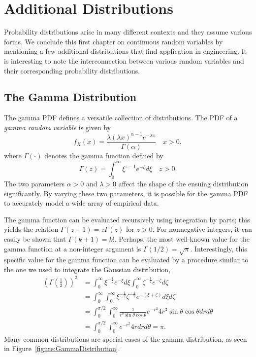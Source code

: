 \section{Additional Distributions}

Probability distributions arise in many different contexts and they assume various forms.
We conclude this first chapter on continuous random variables by mentioning a few additional distributions that find application in engineering.
It is interesting to note the interconnection between various random variables and their corresponding probability distributions.


\subsection{The Gamma Distribution}

The gamma PDF defines a versatile collection of distributions.
The PDF of a \emph{gamma random variable} is given by 
\begin{equation*}
f_X (x) = \frac{\lambda (\lambda x)^{\alpha - 1} e^{-\lambda x}}{\Gamma (\alpha)} \quad  x > 0,
\end{equation*}
where $\Gamma(\cdot)$ denotes the gamma function defined by
\begin{equation*}
\Gamma (z) = \int_0^{\infty} \xi^{z-1} e^{-\xi} d\xi \quad z > 0 .
\end{equation*}
The two parameters $\alpha > 0$ and $\lambda > 0$ affect the shape of the ensuing distribution significantly.
By varying these two parameters, it is possible for the gamma PDF to accurately model a wide array of empirical data.

The gamma function can be evaluated recursively using integration by parts; this yields the relation $\Gamma (z+1) = z \Gamma (z)$ for $z > 0$.
For nonnegative integers, it can easily be shown that $\Gamma (k + 1) = k!$.
Perhaps, the most well-known value for the gamma function at a non-integer argument is $\Gamma ( 1/2 ) = \sqrt{\pi}$.
Interestingly, this specific value for the gamma function can be evaluated by a procedure similar to the one we used to integrate the Gaussian distribution,
\begin{equation*}
\begin{split}
\left( \Gamma \left( \frac{1}{2} \right) \right)^2
&= \int_0^{\infty} \xi^{-\frac{1}{2}} e^{-\xi} d\xi
\int_0^{\infty} \zeta^{-\frac{1}{2}} e^{-\zeta} d\zeta \\
&= \int_0^{\infty} \int_0^{\infty}
\xi^{-\frac{1}{2}} \zeta^{-\frac{1}{2}} e^{-(\xi + \zeta)}
d\xi d\zeta \\
&= \int_0^{\pi / 2} \int_0^{\infty}
\frac{1}{r^2 \sin \theta \cos \theta} e^{-r^2}
4 r^3 \sin \theta \cos \theta dr d\theta \\
&= \int_0^{\pi / 2} \int_0^{\infty}
 e^{-r^2} 4 r dr d\theta
= \pi .
\end{split}
\end{equation*}
Many common distributions are special cases of the gamma distribution, as seen in Figure~\ref{figure:GammaDistribution}.

